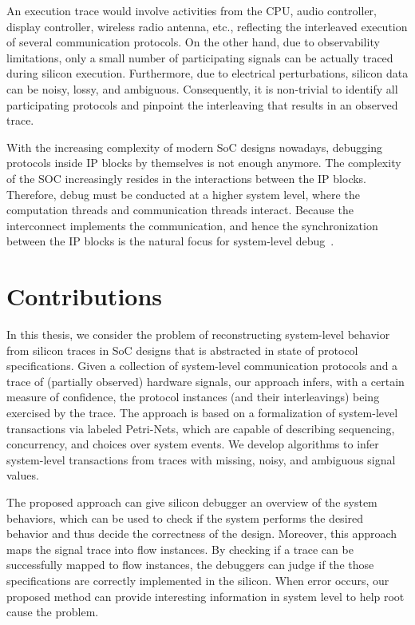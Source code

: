 \documentclass[12pt,frontmatter,copyright,thesis]{usfmanus}
\begin{document}
 An execution trace would involve activities from
the CPU, audio controller, display controller, wireless
radio antenna, etc., reflecting the interleaved execution of
several communication protocols.  On the other hand, due to
observability limitations, only a small number of
participating signals can be actually traced during silicon
execution.  Furthermore, due to electrical perturbations,
silicon data can be noisy, lossy, and ambiguous.
Consequently, it is non-trivial to identify all
participating protocols and pinpoint the interleaving that
results in an observed trace.

With the increasing complexity of modern SoC designs nowadays, 
debugging protocols inside IP
blocks by themselves is not enough anymore. The complexity
of the SOC increasingly resides in the interactions between
the IP blocks. 
Therefore, debug must be conducted
at a higher system level, where the computation threads
and communication threads interact.
 Because the interconnect
implements the communication, and hence the synchronization
between the IP blocks is the natural focus for system-level
debug~\cite{Goossens2007NOCS}.

\section{Contributions}
In this thesis, we consider the problem of reconstructing
system-level behavior from silicon traces in SoC designs that
is abstracted in state of
protocol specifications.
Given a collection of system-level communication protocols
and a trace of (partially observed) hardware signals, our
approach infers, with a certain measure of confidence, the
protocol instances (and their interleavings) being exercised
by the trace.  
The approach is based on a formalization of
system-level transactions via labeled Petri-Nets, which are
capable of describing sequencing, concurrency, and choices
over system events.  We develop algorithms to infer
system-level transactions from traces with missing, noisy,
and ambiguous signal values.

The proposed approach can give silicon debugger
an overview of the system behaviors,
which
can be used to check
if the system performs the desired behavior and thus
decide the correctness of the design.
Moreover,
this approach maps the
signal trace into flow instances. By
checking if a trace can be successfully
mapped to flow instances, the debuggers
can judge if the those specifications are correctly implemented
in the silicon.
When error occurs, our proposed
method can provide interesting information
in system level
to help root cause the problem.
\end{document}

